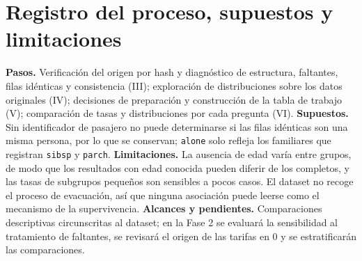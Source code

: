 \documentclass[11pt,letterpaper]{article}
\begin{document}
\section{Registro del proceso, supuestos y limitaciones}
\textbf{Pasos.} Verificación del origen por hash y diagnóstico de estructura, faltantes, filas idénticas y consistencia (III); exploración de distribuciones sobre los datos originales (IV); decisiones de preparación y construcción de la tabla de trabajo (V); comparación de tasas y distribuciones por cada pregunta (VI). \textbf{Supuestos.} Sin identificador de pasajero no puede determinarse si las filas idénticas son una misma persona, por lo que se conservan; \texttt{alone} solo refleja los familiares que registran \texttt{sibsp} y \texttt{parch}. \textbf{Limitaciones.} La ausencia de edad varía entre grupos, de modo que los resultados con edad conocida pueden diferir de los completos, y las tasas de subgrupos pequeños son sensibles a pocos casos. El dataset no recoge el proceso de evacuación, así que ninguna asociación puede leerse como el mecanismo de la supervivencia. \textbf{Alcances y pendientes.} Comparaciones descriptivas circunscritas al dataset; en la Fase 2 se evaluará la sensibilidad al tratamiento de faltantes, se revisará el origen de las tarifas en 0 y se estratificarán las comparaciones.
\end{document}
